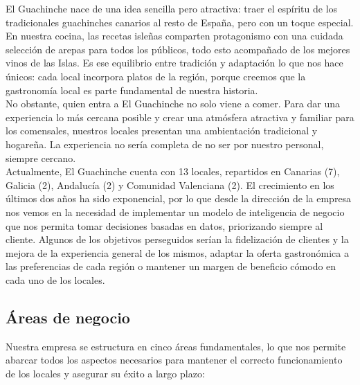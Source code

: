 \documentclass[12pt]{opticajnl}
\begin{document}
El Guachinche nace de una idea sencilla pero atractiva: traer el espíritu de los tradicionales guachinches canarios al resto de España, pero con un toque especial. En nuestra cocina, las recetas isleñas comparten protagonismo con una cuidada selección de arepas para todos los públicos, todo esto acompañado de los mejores vinos de las Islas. Es ese equilibrio entre tradición y adaptación lo que nos hace únicos: cada local incorpora platos de la región, porque creemos que la gastronomía local es parte fundamental de nuestra historia. \\

No obstante, quien entra a El Guachinche no solo viene a comer. Para dar una experiencia lo más cercana posible y crear una atmósfera atractiva y familiar para los comensales, nuestros locales presentan una ambientación tradicional y hogareña. La experiencia no sería completa de no ser por nuestro personal, siempre cercano. \\

Actualmente, El Guachinche cuenta con 13 locales, repartidos en Canarias (7), Galicia (2), Andalucía (2) y Comunidad Valenciana (2). El crecimiento en los últimos dos años ha sido exponencial, por lo que desde la dirección de la empresa nos vemos en la necesidad de implementar un modelo de inteligencia de negocio que nos permita tomar decisiones basadas en datos, priorizando siempre al cliente. Algunos de los objetivos perseguidos serían la fidelización de clientes y la mejora de la experiencia general de los mismos, adaptar la oferta gastronómica a las preferencias de cada región o mantener un margen de beneficio cómodo en cada uno de los locales. \\

\newpage

\subsection{Áreas de negocio}
Nuestra empresa se estructura en cinco áreas fundamentales, lo que nos permite abarcar todos los aspectos necesarios para mantener el correcto funcionamiento de los locales y asegurar su éxito a largo plazo:
\end{document}
